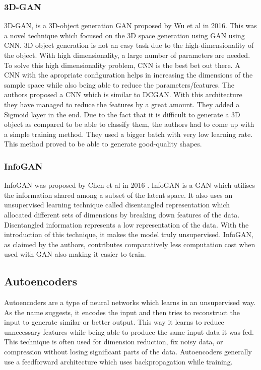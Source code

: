 \documentclass[conference]{IEEEtran}
\begin{document}
\subsubsection{3D-GAN}
3D-GAN, is a 3D-object generation GAN proposed by Wu et al \cite{b8} in 2016. This was a novel technique which focused on the 3D space generation using GAN using CNN. 3D object generation is not an easy task due to the high-dimensionality of the object. With high dimensionality, a large number of parameters are needed. To solve this high dimensionality problem, CNN is the best bet out there. A CNN with the apropriate configuration helps in increasing the dimensions of the sample space while also being able to reduce the parameters/features. The authors proposed a CNN which is similar to DCGAN. With this architecture they have managed to reduce the features by a great amount. They added a Sigmoid layer in the end. Due to the fact that it is difficult to generate a 3D object as compared to be able to classify them, the authors had to come up with a simple training method. They used a bigger batch with very low learning rate. This method proved to be able to generate good-quality shapes.

\subsubsection{InfoGAN}
InfoGAN was proposed by Chen et al in 2016 \cite{b6}. InfoGAN is a GAN which utilises the information shared among a subset of the latent space. It also uses an unsupervised learning technique called disentangled representation which allocated different sets of dimensions by breaking down features of the data. Disentangled information represents a low representation of the data. With the introduction of this technique, it makes the model truly unsupervised. InfoGAN, as claimed by the authors, contributes comparatively less computation cost when used with GAN also making it easier to train. 

\subsection{Autoencoders}
Autoencoders are a type of neural networks which learns in an unsupervised way. As the name suggests, it encodes the input and then tries to reconstruct the input to generate similar or better output. This way it learns to reduce unnecessary features while being able to produce the same input data it was fed. This technique is often used for dimension reduction, fix noisy data, or compression without losing significant parts of the data. Autoencoders generally use a feedforward architecture which uses backpropagation while training.
\end{document}
